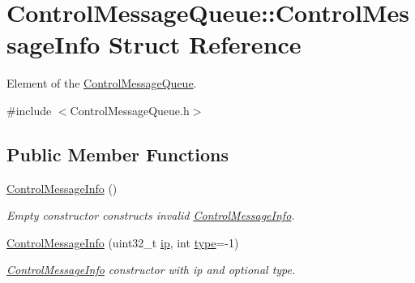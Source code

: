 \hypertarget{structControlMessageQueue_1_1ControlMessageInfo}{}\section{Control\+Message\+Queue\+:\+:Control\+Message\+Info Struct Reference}
\label{structControlMessageQueue_1_1ControlMessageInfo}


Element of the \mbox{\hyperlink{classControlMessageQueue}{Control\+Message\+Queue}}.  




{\ttfamily \#include $<$Control\+Message\+Queue.\+h$>$}

\subsection*{Public Member Functions}
\begin{DoxyCompactItemize}
\item 
\mbox{\label{structControlMessageQueue_1_1ControlMessageInfo_a2e85f6e0583ea739ff6ec35ef1655bef}} 
\mbox{\hyperlink{structControlMessageQueue_1_1ControlMessageInfo_a2e85f6e0583ea739ff6ec35ef1655bef}{Control\+Message\+Info}} ()
\begin{DoxyCompactList}\small\item\em Empty constructor constructs invalid \mbox{\hyperlink{structControlMessageQueue_1_1ControlMessageInfo}{Control\+Message\+Info}}. \end{DoxyCompactList}\item 
\mbox{\hyperlink{structControlMessageQueue_1_1ControlMessageInfo_a86967ffe7674cc77dcb2ddae8917dc32}{Control\+Message\+Info}} (uint32\+\_\+t \mbox{\hyperlink{structControlMessageQueue_1_1ControlMessageInfo_a9c729d9dd8e2bbabfbdfcdaf845065f6}{ip}}, int \mbox{\hyperlink{structControlMessageQueue_1_1ControlMessageInfo_a0166019e4c749c1fcea08074c641af3e}{type}}=-\/1)
\begin{DoxyCompactList}\small\item\em \mbox{\hyperlink{structControlMessageQueue_1_1ControlMessageInfo}{Control\+Message\+Info}} constructor with ip and optional type. \end{DoxyCompactList}\end{DoxyCompactItemize}
